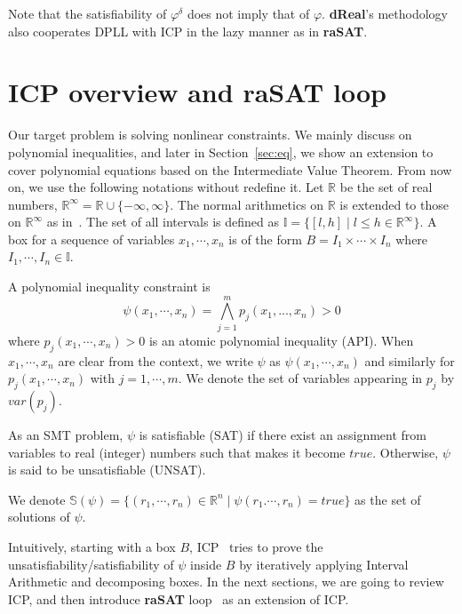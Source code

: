 \documentclass[runningheads,a4paper,oribibl]{llncs}
\newcommand{\Real}{{\mathbb R}}
\begin{document}
{Note that the satisfiability of $\varphi^\delta$ does not imply that of $\varphi$. 
\textbf{dReal}'s methodology~\cite{Gao:2012:9DP:2352896.2352921} also cooperates DPLL with ICP 
in the lazy manner as in \textbf{raSAT}.

\medskip 
}

\section{ICP overview and \textbf{raSAT} loop}
\label{sec:raSATloop} 

\sloppy

Our target problem is solving nonlinear constraints.
We mainly discuss on polynomial inequalities, and later in Section~\ref{sec:eq},
we show an extension to cover polynomial equations based on the
Intermediate Value Theorem. From now on, we use the following notations without redefine it. Let $\mathbb{R}$ be the set of real numbers, $\mathbb{R}^\infty = \mathbb{R} \cup \{-\infty, \infty \}$. The normal arithmetics on $\mathbb{R}$ is extended to those on $\mathbb{R}^\infty$ as in~\cite{moore}. The set of all intervals is defined as $\mathbb{I} = \{[l, h] \mid l \le h \in \mathbb{R}^\infty \}$. A box for a sequence of variables $x_1, \cdots, x_n$ is of the form $B = I_1 \times \cdots \times I_n$ where $I_1, \cdots, I_n \in \mathbb{I}$.

\begin{definition}
A polynomial inequality constraint is
\[\psi(x_1,\cdots,x_n) = \bigwedge
\limits_{j=1}^m p_j(x_1,...,x_n) > 0\]
where $p_j(x_1,\cdots,x_n) > 0$ is an atomic polynomial inequality (API). When $x_1, \cdots, x_n$ are clear from the context, we write $\psi$ as $\psi(x_1, \cdots, x_n)$ and similarly for $p_j(x_1, \cdots, x_n)$ with $j = 1, \cdots, m$.
We denote the set of variables appearing in $p_j$ by $var(p_j)$. 
\end{definition}
As an SMT problem, $\psi$ is satisfiable (SAT) if there exist an assignment from variables to real (integer) numbers such that makes it become $true$. Otherwise, $\psi$ is said to be unsatisfiable (UNSAT).

We denote ${\mathbb{S}(\psi) = \{(r_1,\cdots, r_n) \in \Real^n \mid
  \psi(r_1. \cdots, r_n)=true\}}$ as the set of solutions of $\psi$.

Intuitively, starting with a box $B$, ICP~\cite{benhamou:hal-00480814} tries to prove the unsatisfiability/satisfiability of $\psi$ inside $B$ by iteratively applying Interval Arithmetic and decomposing boxes. In the next sections, we are going to review ICP, and then introduce
\textbf{raSAT} loop~\cite{VanKhanh201227} as an extension of ICP. 
\end{document}
